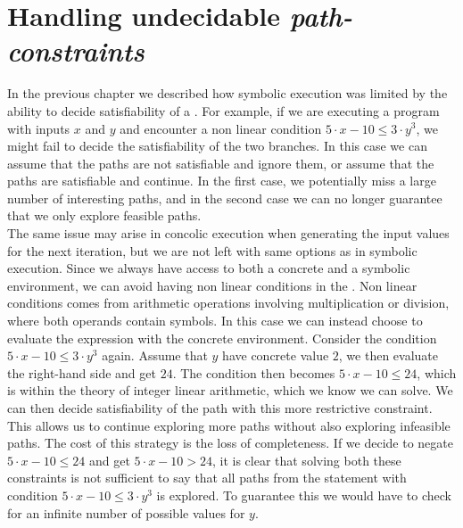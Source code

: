 \section{Handling undecidable \emph{path-constraints}} 
In the previous chapter we described how symbolic execution was limited by the ability to decide satisfiability of a \pc. For example, if we are executing a program with inputs $x$ and $y$ and encounter a non linear condition $ 5\cdot x - 10 \leq 3 \cdot y^3$, we might fail to decide the satisfiability of the two branches. In this case we can assume that the paths are not satisfiable and ignore them, or assume that the paths are satisfiable and continue. In the first case, we potentially miss a large number of interesting paths, and in the second case we can no longer guarantee that we only explore feasible paths.\\
The same issue may arise in concolic execution when generating the input values for the next iteration, but we are not left with same options as in symbolic execution. Since we always have access to both a concrete and a symbolic environment, we can avoid having non linear conditions in the \pc. Non linear conditions comes from arithmetic operations involving multiplication or division, where both operands contain symbols. In this case we can instead choose to evaluate the expression with the concrete environment\cite{Godefroid:2005:DDA:1064978.1065036}. Consider the condition $ 5\cdot x - 10 \leq 3 \cdot y^3$ again. Assume that $y$ have concrete value $2$, we then evaluate the right-hand side and get $24$. The condition then becomes $ 5\cdot x - 10 \leq 24$, which is within the theory of integer linear arithmetic, which we know we can solve. We can then decide satisfiability of the path with this more restrictive constraint. This allows us to continue exploring more paths without also exploring infeasible paths. The cost of this strategy is the loss of completeness. If we decide to negate $5\cdot x - 10 \leq 24$ and get $5\cdot x - 10 > 24$, it is clear that solving both these constraints is not sufficient to say that all paths from the statement with condition $ 5\cdot x - 10 \leq 3 \cdot y^3$ is explored. To guarantee this we would have to check for an infinite number of possible values for $y$. 